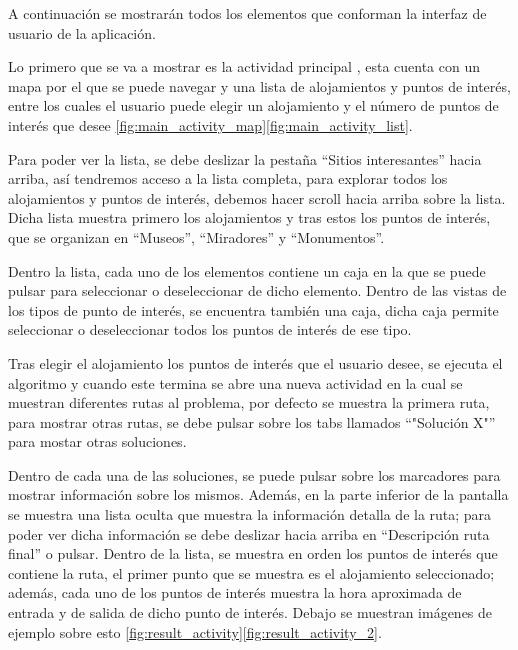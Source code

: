 A continuación se mostrarán todos los elementos que conforman la interfaz de usuario de la aplicación.\newline

Lo primero que se va a mostrar es la actividad principal , esta cuenta con un mapa por el que se puede navegar y una lista de alojamientos y puntos de interés, entre los cuales el usuario puede elegir un alojamiento y el número de puntos de interés que desee \ref{fig:main_activity_map}\ref{fig:main_activity_list}.\newline

Para poder ver la lista, se debe deslizar la pestaña \enquote{Sitios interesantes} hacia arriba, así tendremos acceso a la lista completa, para explorar todos los alojamientos y puntos de interés, debemos hacer scroll hacia arriba sobre la lista. Dicha lista muestra primero los alojamientos y tras estos los puntos de interés, que se organizan en \enquote{Museos}, \enquote{Miradores} y \enquote{Monumentos}.\newline

Dentro la lista, cada uno de los elementos contiene un caja en la que se puede pulsar para seleccionar o deseleccionar de dicho elemento. Dentro de las vistas de los tipos de punto de interés, se encuentra también una caja, dicha caja permite seleccionar o deseleccionar todos los puntos de interés de ese tipo.\newline

Tras elegir el alojamiento los puntos de interés que el usuario desee, se ejecuta el algoritmo y cuando este termina se abre una nueva actividad en la cual se muestran diferentes rutas al problema, por defecto se muestra la primera ruta, para mostrar otras rutas, se debe pulsar sobre los tabs llamados \enquote{"Solución X"} para mostar otras soluciones.\newline

Dentro de cada una de las soluciones, se puede pulsar sobre los marcadores para mostrar información sobre los mismos. Además, en la parte inferior de la pantalla se muestra una lista oculta que muestra la información detalla de la ruta; para poder ver dicha información se debe deslizar hacia arriba en \enquote{Descripción ruta final} o pulsar. Dentro de la lista, se muestra en orden los puntos de interés que contiene la ruta, el primer punto que se muestra es el alojamiento seleccionado; además, cada uno de los puntos de interés muestra la hora aproximada de entrada y de salida de dicho punto de interés. Debajo se muestran imágenes de ejemplo sobre esto \ref{fig:result_activity}\ref{fig:result_activity_2}.


